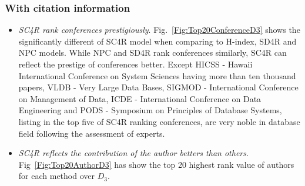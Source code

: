 \documentclass[10pt,leqno,twoside]{article}
\begin{document}
%
\subsubsection{With citation information}
%
%
\begin{itemize}
\item \textit{SC4R rank conferences prestigiously}. Fig.~\ref{Fig:Top20ConferenceD3} shows the significantly different of SC4R model when comparing to H-index, SD4R and NPC models. While NPC and SD4R rank conferences similarly, SC4R can reflect the prestige of conferences better. Except HICSS - Hawaii International Conference on System Sciences having more than ten thousand papers, VLDB - Very Large Data Bases, SIGMOD - International Conference on Management of Data, ICDE - International Conference on Data Engineering and PODS - Symposium on Principles of Database Systems, listing in the top five of SC4R ranking conferences, are very noble in database field following the assessment of experts.

\item\textit{SC4R reflects the contribution of the author betters than others}. Fig~\ref{Fig:Top20AuthorD3} has show the top 20 highest rank value of authors for each method over $D_3$.

\end{itemize}
\end{document}
